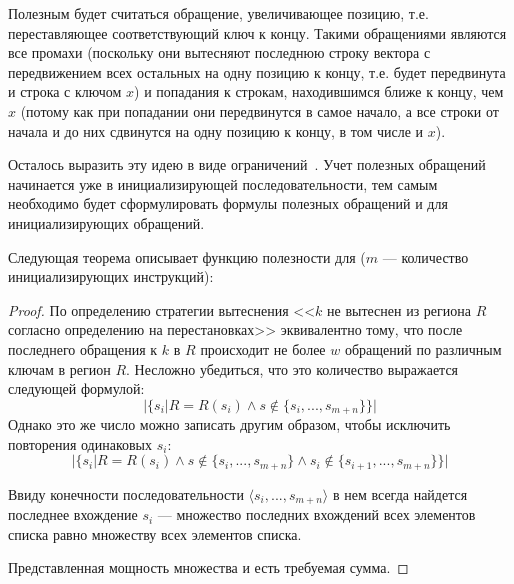 \begin{enumerate}
Полезным будет считаться обращение, увеличивающее позицию, т.е.
переставляющее соответствующий ключ к концу. Такими обращениями являются все
промахи (поскольку они вытесняют последнюю строку вектора с передвижением всех остальных на одну позицию к концу, т.е. будет передвинута и строка с ключом $x$) и
попадания к строкам, находившимся ближе к концу, чем $x$ (потому как при попадании они передвинутся в самое начало, а все строки от начала и до них сдвинутся на одну
позицию к концу, в том числе и $x$).

Осталось выразить эту идею в виде ограничений~\cite{my_ewdts_2009}.
Учет полезных обращений начинается уже в инициализирующей последовательности,
тем самым необходимо будет сформулировать формулы полезных обращений и для
инициализирующих обращений.

Следующая теорема описывает функцию полезности для \LRU ($m$ --- количество
инициализирующих инструкций):

\begin{theorem}\label{correct_mirror_LRU} \LRUusefuls
\end{theorem}

\begin{proof}
По определению стратегии вытеснения \LRU <<$k$ не вытеснен из региона $R$ согласно определению на перестановках>> эквивалентно тому, что после последнего обращения к $k$ в $R$ происходит не более $w$ обращений по различным ключам в регион $R$. Несложно убедиться, что это количество выражается следующей формулой: $$|\{s_i| R = R(s_i) \wedge s \notin \{s_i, ..., s_{m+n}\}\}|$$
Однако это же число можно записать другим образом, чтобы исключить повторения одинаковых $s_i$:
$$|\{s_i| R = R(s_i) \wedge s \notin \{s_i, ..., s_{m+n}\} \wedge s_i \notin \{s_{i+1}, ..., s_{m+n}\}\}|$$

Ввиду конечности последовательности $\langle s_i, ..., s_{m+n}\rangle$ в нем всегда найдется последнее вхождение $s_i$ --- множество последних вхождений всех элементов списка равно множеству всех элементов списка.

Представленная мощность множества и есть требуемая сумма.
\end{proof}


\end{enumerate}
